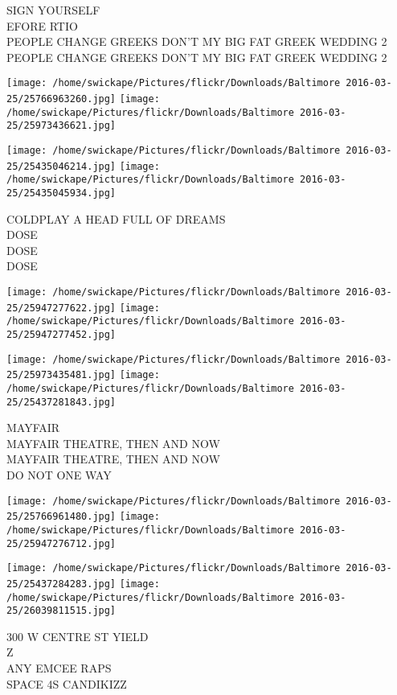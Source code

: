 \documentclass[10pt,letterpaper]{article}
\begin{document}
SIGN YOURSELF\\
EFORE RTIO\\
PEOPLE CHANGE GREEKS DON'T MY BIG FAT GREEK WEDDING 2\\
PEOPLE CHANGE GREEKS DON'T MY BIG FAT GREEK WEDDING 2\\
\pagebreak

\texttt{[image: /home/swickape/Pictures/flickr/Downloads/Baltimore 2016-03-25/25766963260.jpg]}
\texttt{[image: /home/swickape/Pictures/flickr/Downloads/Baltimore 2016-03-25/25973436621.jpg]}

\texttt{[image: /home/swickape/Pictures/flickr/Downloads/Baltimore 2016-03-25/25435046214.jpg]}
\texttt{[image: /home/swickape/Pictures/flickr/Downloads/Baltimore 2016-03-25/25435045934.jpg]}

COLDPLAY A HEAD FULL OF DREAMS\\
DOSE\\
DOSE\\
DOSE\\
\pagebreak

\texttt{[image: /home/swickape/Pictures/flickr/Downloads/Baltimore 2016-03-25/25947277622.jpg]}
\texttt{[image: /home/swickape/Pictures/flickr/Downloads/Baltimore 2016-03-25/25947277452.jpg]}

\texttt{[image: /home/swickape/Pictures/flickr/Downloads/Baltimore 2016-03-25/25973435481.jpg]}
\texttt{[image: /home/swickape/Pictures/flickr/Downloads/Baltimore 2016-03-25/25437281843.jpg]}

MAYFAIR\\
MAYFAIR THEATRE, THEN AND NOW\\
MAYFAIR THEATRE, THEN AND NOW\\
DO NOT ONE WAY\\
\pagebreak

\texttt{[image: /home/swickape/Pictures/flickr/Downloads/Baltimore 2016-03-25/25766961480.jpg]}
\texttt{[image: /home/swickape/Pictures/flickr/Downloads/Baltimore 2016-03-25/25947276712.jpg]}

\texttt{[image: /home/swickape/Pictures/flickr/Downloads/Baltimore 2016-03-25/25437284283.jpg]}
\texttt{[image: /home/swickape/Pictures/flickr/Downloads/Baltimore 2016-03-25/26039811515.jpg]}

300 W CENTRE ST YIELD\\
Z\\
ANY EMCEE RAPS\\
SPACE 4S CANDIKIZZ\\
\pagebreak
\end{document}
